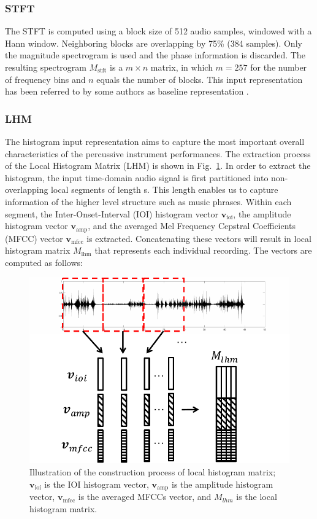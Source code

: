 \documentclass{ws-ijsc}
\begin{document}
\subsubsection{STFT}\label{subsec:stft}
The STFT is computed using a block size of 512 audio samples, windowed with a Hann window. Neighboring blocks are overlapping by 75\% (384 samples). Only the magnitude spectrogram is used and the phase information is discarded. The resulting spectrogram $M_\mathrm{stft}$ is a $m \times n$ matrix, in which $m = 257$ for the number of frequency bins and $n$ equals the number of blocks. This input representation has been referred to by some authors as baseline representation \cite{Su2014Guitar,Su2014Violin}. %

\subsubsection{LHM}
The histogram input representation aims to capture the most important overall characteristics of the percussive instrument performances. The extraction process of the Local Histogram Matrix (LHM) is shown in Fig.~\ref{fig:hist_mat}. In order to extract the histogram, the input time-domain audio signal is first partitioned into non-overlapping local segments of length \unit[10]{s}. This length enables us to capture information of the higher level structure such as music phrases. Within each segment, the Inter-Onset-Interval (IOI) histogram vector $\mathbf{v}_\mathrm{ioi}$, the amplitude histogram vector $\mathbf{v}_\mathrm{amp}$, and the averaged Mel Frequency Cepstral Coefficients (MFCC) vector $\mathbf{v}_\mathrm{mfcc}$ is extracted.
Concatenating these vectors will result in local histogram matrix $M_\mathrm{lhm}$ that represents each individual recording. The vectors are computed as follows:
\begin{figure}
    \centering
    \includegraphics[width = 8 cm]{./figs/hist_mat.pdf}
    \caption{Illustration of the construction process of local histogram matrix; $\mathbf{v}_\mathrm{ioi}$ is the IOI histogram vector, $\mathbf{v}_\mathrm{amp}$ is the amplitude histogram vector, $\mathbf{v}_\mathrm{mfcc}$ is the averaged MFCCs vector, and $M_{lhm}$ is the local histogram matrix.}
    \label{fig:hist_mat}
\end{figure}
\end{document}
